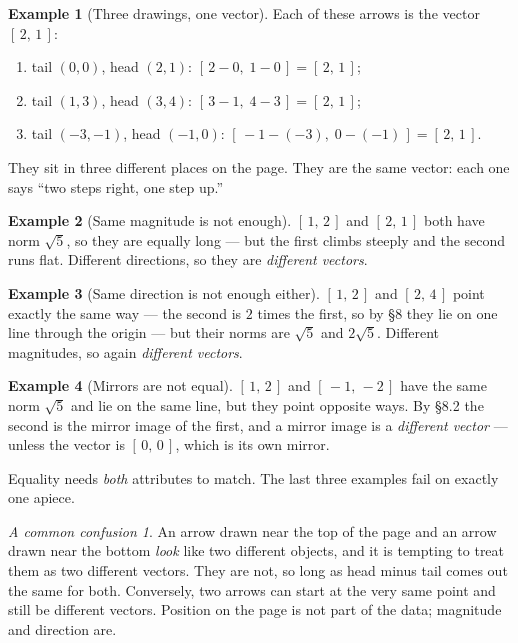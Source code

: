 \documentclass[11pt]{article}
\theoremstyle{definition}
\newtheorem{ex}{Example}[section]
\theoremstyle{remark}
\newtheorem*{warn}{A common confusion}
\begin{document}
\begin{ex}[Three drawings, one vector]
Each of these arrows is the vector $[\,2,\,1\,]$:
\begin{enumerate}[label=(\roman*),leftmargin=2.4em,itemsep=2pt,topsep=3pt]
  \item tail $(0,0)$, head $(2,1)$: \quad $[\,2-0,\;1-0\,]=[\,2,\,1\,]$;
  \item tail $(1,3)$, head $(3,4)$: \quad $[\,3-1,\;4-3\,]=[\,2,\,1\,]$;
  \item tail $(-3,-1)$, head $(-1,0)$: \quad $[\,-1-(-3),\;0-(-1)\,]=[\,2,\,1\,]$.
\end{enumerate}
They sit in three different places on the page. They are the same vector: each
one says ``two steps right, one step up.''
\end{ex}

\begin{ex}[Same magnitude is not enough]
$[\,1,\,2\,]$ and $[\,2,\,1\,]$ both have norm $\sqrt5$, so they are equally
long --- but the first climbs steeply and the second runs flat. Different
directions, so they are \emph{different vectors}.
\end{ex}

\begin{ex}[Same direction is not enough either]
$[\,1,\,2\,]$ and $[\,2,\,4\,]$ point exactly the same way --- the second is
$2$ times the first, so by \S8 they lie on one line through the origin --- but
their norms are $\sqrt5$ and $2\sqrt5$. Different magnitudes, so again
\emph{different vectors}.
\end{ex}

\begin{ex}[Mirrors are not equal]
$[\,1,\,2\,]$ and $[\,-1,\,-2\,]$ have the same norm $\sqrt5$ and lie on the
same line, but they point opposite ways. By \S8.2 the second is the mirror image
of the first, and a mirror image is a \emph{different vector} --- unless the
vector is $[\,0,\,0\,]$, which is its own mirror.
\end{ex}

\noindent Equality needs \emph{both} attributes to match. The last three
examples fail on exactly one apiece.

\begin{warn}
An arrow drawn near the top of the page and an arrow drawn near the bottom
\emph{look} like two different objects, and it is tempting to treat them as two
different vectors. They are not, so long as head minus tail comes out the same
for both. Conversely, two arrows can start at the very same point and still be
different vectors. Position on the page is not part of the data; magnitude and
direction are.
\end{warn}
\end{document}
